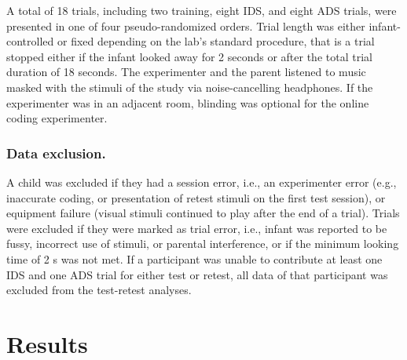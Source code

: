 \documentclass[
  man,floatsintext]{apa6}
\begin{document}
A total of 18 trials, including two training, eight IDS, and eight ADS trials, were presented in one of four pseudo-randomized orders. Trial length was either infant-controlled or fixed depending on the lab's standard procedure, that is a trial stopped either if the infant looked away for 2 seconds or after the total trial duration of 18 seconds. The experimenter and the parent listened to music masked with the stimuli of the study via noise-cancelling headphones. If the experimenter was in an adjacent room, blinding was optional for the online coding experimenter.

\hypertarget{data-exclusion.}{%
\subsubsection{Data exclusion.}\label{data-exclusion.}}

A child was excluded if they had a session error, i.e., an experimenter error (e.g., inaccurate coding, or presentation of retest stimuli on the first test session), or equipment failure (visual stimuli continued to play after the end of a trial). Trials were excluded if they were marked as trial error, i.e., infant was reported to be fussy, incorrect use of stimuli, or parental interference, or if the minimum looking time of 2 s was not met. If a participant was unable to contribute at least one IDS and one ADS trial for either test or retest, all data of that participant was excluded from the test-retest analyses.

\hypertarget{results}{%
\section{Results}\label{results}}
\end{document}
